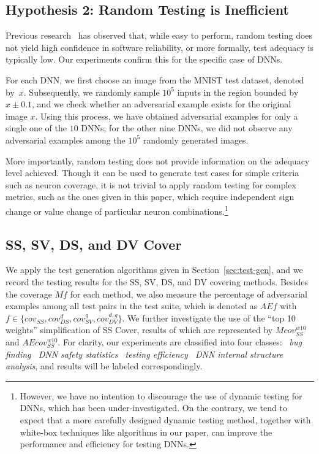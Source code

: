\documentclass[runningheads,a4paper]{llncs}
\newcommand{\valuefunction}{g}
\newcommand{\covered}[3]{cov_{#1}^{#2}#3}
\begin{document}
\subsection{Hypothesis 2: Random Testing is Inefficient}\label{sec:random}

Previous research~\cite{ZHM1997} has observed that, while easy to perform,
random testing does not yield high confidence in software reliability, or
more formally, test adequacy is typically low.
Our experiments confirm this for the specific case of DNNs.

For each DNN, we first choose an image from the MNIST test dataset, denoted
by~$x$.  Subsequently, we randomly sample $10^5$ inputs in the region
bounded by $x\pm 0.1$, and we check whether an adversarial example exists
for the original image $x$.  Using this process, we have obtained
adversarial examples for only a single one of the $10$ DNNs; for the other
nine DNNs, we did not observe any adversarial examples among the $10^5$
randomly generated images.

More importantly, random testing does not provide information on the
adequacy level achieved.  Though it can be used to generate test cases for
simple criteria such as neuron coverage, it is not trivial to apply random
testing for complex metrics, such as the ones given in this paper, which
require independent sign change or value change of particular neuron
combinations.\footnote{However, we have no intention to discourage the use of
dynamic testing for DNNs, which has been under-investigated.  On the
contrary, we tend to expect that a more carefully designed dynamic testing method,
together with white-box techniques like algorithms in our paper, can improve
the performance and efficiency for testing DNNs.}\subsection{SS, SV, DS, and DV Cover}

We apply the test generation algorithms given in Section~\ref{sec:test-gen},
and we record the testing results for the SS, SV, DS, and DV covering
methods.  Besides the coverage $Mf$ for each method, we also measure the
percentage of adversarial examples among all test pairs in the test suite,
which is denoted as $AEf$ with
$f\in\{\covered{SS}{}{},\covered{DS}{d}{},\covered{SV}{\valuefunction}{},\covered{DV}{d,\valuefunction}{}\}$.
We further investigate the use of the ``top 10 weights'' simplification of
SS Cover, results of which are represented by $M{cov_{SS}^{w10}}$ and
$AE{cov_{SS}^{w10}}$.  For clarity, our experiments are classified into four
classes: \emph{~bug finding ~DNN safety statistics
~testing efficiency ~DNN internal structure
analysis}, and results will be labeled correspondingly.
\end{document}
